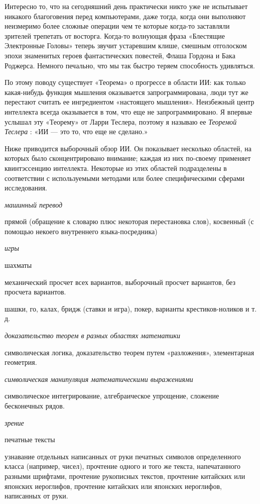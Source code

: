 \documentclass[../main.tex]{subfiles}
\begin{document}
Интересно то, что на сегодняшний день практически никто уже не испытывает никакого благоговения перед компьютерами, даже тогда, когда они выполняют неизмеримо более сложные операции чем те которые когда-то заставляли зрителей трепетать от восторга. Когда-то волнующая фраза «Блестящие Электронные Головы» теперь звучит устаревшим клише, смешным отголоском эпохи знаменитых героев фантастических повестей, Флаша Гордона и Бака Роджерса. Немного печально, что мы так быстро теряем способность удивляться.

По этому поводу существует «Теорема» о прогрессе в области ИИ: как только какая-нибудь функция мышления оказывается запрограммирована, люди тут же перестают считать ее ингредиентом «настоящего мышления». Неизбежный центр интеллекта всегда оказывается в том, что еще не запрограммировано. Я впервые услышал эту «Теорему» от Ларри Теслера, поэтому я называю ее \emph{Теоремой Теслера} : «ИИ --- это то, что еще не сделано.»

Ниже приводится выборочный обзор ИИ. Он показывает несколько областей, на которых было сконцентрировано внимание; каждая из них по-своему применяет квинтэссенцию интеллекта. Некоторые из этих областей подразделены в соответствии с используемыми методами или более специфическими сферами исследования.

\emph{машинный перевод}

прямой (обращение к словарю плюс некоторая перестановка слов), косвенный (с помощью некоего внутреннего языка-посредника)

\emph{игры}

шахматы

механический просчет всех вариантов, выборочный просчет вариантов, без просчета вариантов.

шашки, го, калах, бридж (ставки и игра), покер, варианты крестиков-ноликов и т. д.

\emph{доказательство теорем в разных областях математики}

символическая логика, доказательство теорем путем «разложения», элементарная геометрия.

\emph{символическая манипуляция математическими выражениями}

символическое интегрирование, алгебраическое упрощение, сложение бесконечных рядов.

\emph{зрение}

печатные тексты

узнавание отдельных написанных от руки печатных символов определенного класса (например, чисел), прочтение одного и того же текста, напечатанного разными шрифтами, прочтение рукописных текстов, прочтение китайских или японских иероглифов, прочтение китайских или японских иероглифов, написанных от руки.
\end{document}
